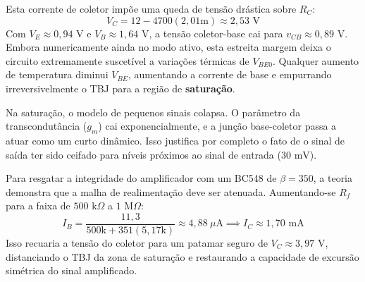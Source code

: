 Esta corrente de coletor impõe uma queda de tensão drástica sobre $R_C$:
\begin{equation}
	V_C = 12 - 4700(2,01\text{m}) \approx 2,53\text{ V}
\end{equation}
Com $V_E \approx 0,94\text{ V}$ e $V_B \approx 1,64\text{ V}$, a tensão coletor-base cai para $v_{CB} \approx 0,89\text{ V}$. Embora numericamente ainda no modo ativo, esta estreita margem deixa o circuito extremamente suscetível a variações térmicas de $V_{BE0}$. Qualquer aumento de temperatura diminui $V_{BE}$, aumentando a corrente de base e empurrando irreversivelmente o TBJ para a região de \textbf{saturação}. 

Na saturação, o modelo de pequenos sinais colapsa. O parâmetro da transcondutância ($g_m$) cai exponencialmente, e a junção base-coletor passa a atuar como um curto dinâmico. Isso justifica por completo o fato de o sinal de saída ter sido ceifado para níveis próximos ao sinal de entrada ($30\text{ mV}$).

Para resgatar a integridade do amplificador com um BC548 de $\beta = 350$, a teoria demonstra que a malha de realimentação deve ser atenuada. Aumentando-se $R_f$ para a faixa de $500\text{ k}\Omega$ a $1\text{ M}\Omega$:
\begin{equation}
	I_B = \frac{11,3}{500\text{k} + 351(5,17\text{k})} \approx 4,88\ \mu\text{A} \implies I_C \approx 1,70\text{ mA}
\end{equation}
Isso recuaria a tensão do coletor para um patamar seguro de $V_C \approx 3,97\text{ V}$, distanciando o TBJ da zona de saturação e restaurando a capacidade de excursão simétrica do sinal amplificado.
